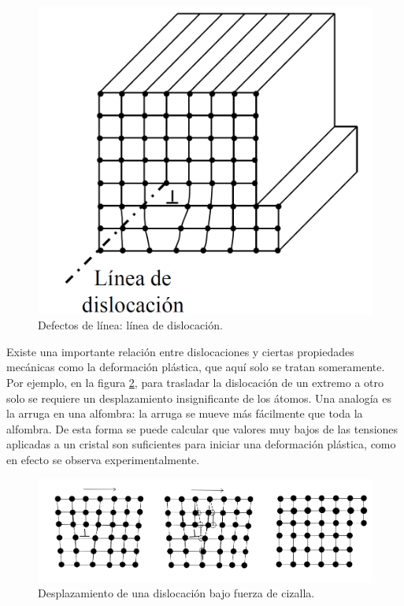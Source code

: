 \begin{figure}[h!] \centering
    \includegraphics[scale=0.35]{Cuerpo/Ch_01/linea_dislocacion.png}
    \caption{Defectos de línea: línea de dislocación.}
    \label{Fig:01-07}
\end{figure}

Existe una importante relación entre dislocaciones y ciertas propiedades mecánicas como la deformación plástica, que aquí solo se tratan someramente. Por ejemplo, en la figura \ref{Fig:01-08}, para trasladar la dislocación de un extremo a otro solo se requiere un desplazamiento insignificante de los átomos. Una analogía es la arruga en una alfombra: la arruga se mueve más fácilmente que toda la alfombra. De esta forma se puede calcular que valores muy bajos de las tensiones aplicadas a un cristal son suficientes para iniciar una deformación plástica, como en efecto se observa experimentalmente.

\begin{figure}[h!] \centering
    \includegraphics[scale=0.6]{Cuerpo/Ch_01/desplazamiento.png}
    \caption{Desplazamiento de una dislocación bajo fuerza de cizalla.}
    \label{Fig:01-08}
\end{figure}

